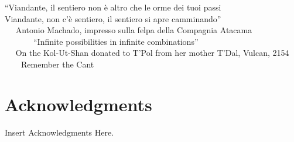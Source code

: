 
\begin{flushright}
``Viandante, il sentiero non \`e altro che le orme dei tuoi passi \\
 Viandante, non c'\`e sentiero, il sentiero si apre camminando''\\ \,\,\,\,\,\,
\scriptsize
Antonio Machado, impresso sulla felpa della Compagnia Atacama \\ \,\,\,\,\,\,\,\,\,\,\,\,\,\,\,\,\,\,\,
\normalsize
``Infinite possibilities in infinite combinations'' \\ \,\,\,\,\,\,
\scriptsize
On the Kol-Ut-Shan donated to T'Pol from her mother T'Dal, Vulcan, 2154
\normalsize \\ \,\,\,\,\,\,\,\,\,\,
Remember the Cant
\end{flushright}

\section*{Acknowledgments}
\lhead[\fancyplain{}{\thepage}]{\fancyplain{}{\rightmark}}
 \thispagestyle{plain}


	Insert Acknowledgments Here.


\clearpage


\thispagestyle{plain}
\par{}
\clearpage

